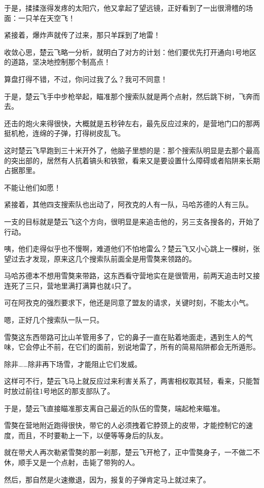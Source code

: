 于是，揉揉涨得发疼的太阳穴，他又拿起了望远镜，正好看到了一出很滑稽的场面：一只羊在天空飞！

紧接着，爆炸声就传了过来，那只羊踩到了地雷！

收敛心思，楚云飞略一分析，就明白了对方的计划：他们要优先打开通向1号地区的道路，坚决地控制那个制高点！

算盘打得不错，不过，你问过我了么？我可不同意！

于是，楚云飞手中步枪举起，瞄准那个搜索队就是两个点射，然后跳下树，飞奔而去。

还击的炮火来得很快，大概就是五秒钟左右，最先反应过来的，是营地门口的那两挺机枪，连绵的子弹，打得树皮乱飞。

这时楚云飞早跑到三十米开外了，他脑子里想的是：那个搜索队明显是去那个最高的突出部的，居然有人抗着镐头和铁锨，看来又是要设置什么障碍或者陷阱来长期占据那里。

不能让他们如愿！

紧接着，其他四支搜索队也出动了，阿孜克的人有一队，马哈苏德的人有三队。

一支的目标就是楚云飞这个方向，很明显是来追击他的，另三支各搜各的，开始了行动。

咦，他们走得似乎也不慢啊，难道他们不怕地雷么？楚云飞又小心跳上一棵树，张望过去才发现，原来这几个搜索队前面全是用雪獒来领路的。

马哈苏德本不想用雪獒来带路，这东西看守营地实在是很管用，前两天追击时又接连死了三只，营地里满打满算也就4只了。

可在阿孜克的强烈要求下，他还是同意了盟友的请求，关键时刻，不能太小气。

嗯，正好几个搜索队一队一只。

雪獒这东西带路可比山羊管用多了，它的鼻子一直在贴着地面走，遇到生人的气味，它会停止不前，在它们的面前，别说地雷了，所有的简易陷阱都会无所遁形。

除非……除非再下场雪，才能阻止它们发威。

这样可不行，楚云飞马上就反应过来利害关系了，两害相权取其轻，看来，只能暂时放过前往1号地区的那支部队了。

于是，楚云飞直接瞄准那支离自己最近的队伍的雪獒，端起枪来瞄准。

雪獒在营地附近跑得很快，带它的人必须拽着它脖颈上的皮带，才能控制它的速度，而且，不时要勒上一下，以便等等身后的队友。

就在带犬人再次勒紧雪獒的那一刹那，楚云飞开枪了，正中雪獒身子，一不做二不休，顺手又是一个点射，击毙了带狗的人。

然后，那自然是火速撤退，因为，报复的子弹肯定马上就过来了。

